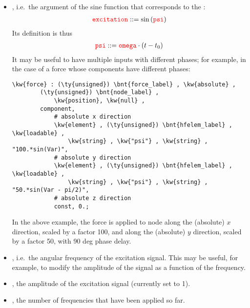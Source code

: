 \begin{itemize}
\item {}, i.e.\ the argument of the sine function that corresponds to the :
\begin{align}
	\textcolor{red}{\texttt{excitation}} ::= \sin\left( \textcolor{red}{\texttt{psi}} \right)
\end{align}
Its definition is thus
\begin{align}
	\textcolor{red}{\texttt{psi}} ::= \textcolor{red}{\texttt{omega}} \cdot (t - t_0)
\end{align}
It may be useful to have multiple inputs with different phases; for example, in the case of a force whose components have different phases:
\begin{Verbatim}[commandchars=\\\{\}]
    \kw{force} : (\ty{unsigned}) \bnt{force_label} , \kw{absolute} ,
        (\ty{unsigned}) \bnt{node_label} ,
            \kw{position}, \kw{null} ,
        component,
            # absolute x direction
            \kw{element} , (\ty{unsigned}) \bnt{hfelem_label} , \kw{loadable} ,
                \kw{string} , \kw{"psi"} , \kw{string} , "100.*sin(Var)",
            # absolute y direction
            \kw{element} , (\ty{unsigned}) \bnt{hfelem_label} , \kw{loadable} ,
                \kw{string} , \kw{"psi"} , \kw{string} , "50.*sin(Var - pi/2)",
            # absolute z direction
            const, 0.;
\end{Verbatim}
In the above example, the force is applied to node 
along the (absolute) $x$ direction, scaled by a factor 100, and
along the (absolute) $y$ direction, scaled by a factor 50, with 90 deg phase delay.

\item {}, i.e.\ the angular frequency of the excitation signal.
This may be useful, for example, to modify the amplitude of the signal as a function of the frequency.

\item {}, the amplitude of the excitation signal (currently set to 1).

\item {}, the number of frequencies that have been applied so far.

\end{itemize}

